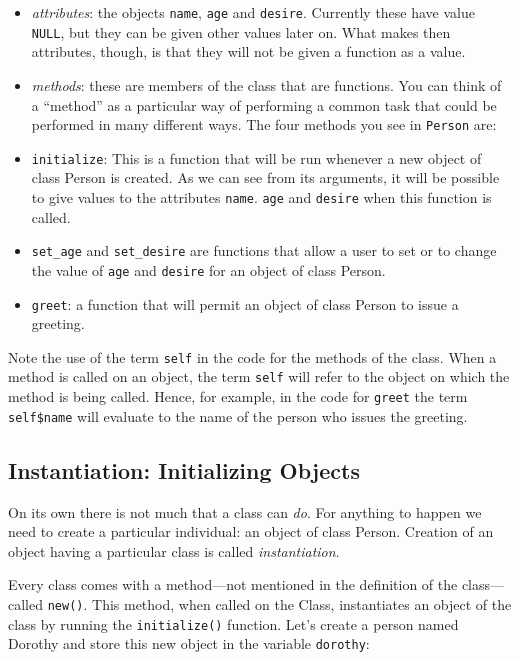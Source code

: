 \documentclass[]{book}
\providecommand{\tightlist}{%
  \setlength{\itemsep}{0pt}\setlength{\parskip}{0pt}}
\theoremstyle{definition}
\theoremstyle{definition}
\theoremstyle{definition}
\theoremstyle{remark}
\begin{document}
{\begin{itemize}
  \begin{itemize}
  \tightlist
  \item
    \emph{attributes}: the objects \texttt{name},
    \texttt{age} and \texttt{desire}. Currently these have value
    \texttt{NULL}, but they can be given other values later on. What
    makes then attributes, though, is that they will not be given a
    function as a value.
  \item
    \emph{methods}: these are members of the class that
    are functions. You can think of a ``method'' as a particular way of
    performing a common task that could be performed in many different
    ways. The four methods you see in \texttt{Person} are:
  \item
    \texttt{initialize}: This is a function that will be run whenever a
    new object of class Person is created. As we can see from its
    arguments, it will be possible to give values to the attributes
    \texttt{name}. \texttt{age} and \texttt{desire} when this function
    is called.
  \item
    \texttt{set\_age} and \texttt{set\_desire} are functions that allow
    a user to set or to change the value of \texttt{age} and
    \texttt{desire} for an object of class Person.
  \item
    \texttt{greet}: a function that will permit an object of class
    Person to issue a greeting.
  \end{itemize}
\end{itemize}

Note the use of the term \texttt{self} in the code for the methods of
the class. When a method is called on an object, the term \texttt{self}
will refer to the object on which the method is being called. Hence, for
example, in the code for \texttt{greet} the term \texttt{self\$name}
will evaluate to the name of the person who issues the greeting.

\subsection{Instantiation: Initializing
Objects}\label{instantiation-initializing-objects}

On its own there is not much that a class can \emph{do}. For anything to
happen we need to create a particular individual: an object of class
Person. Creation of an object having a particular class is called
\emph{instantiation}. 

Every class comes with a method---not mentioned in the definition of the
class---called \texttt{new()}. This method, when called on the Class,
instantiates an object of the class by running the \texttt{initialize()}
function. Let's create a person named Dorothy and store this new object
in the variable \texttt{dorothy}:

}
\end{document}
